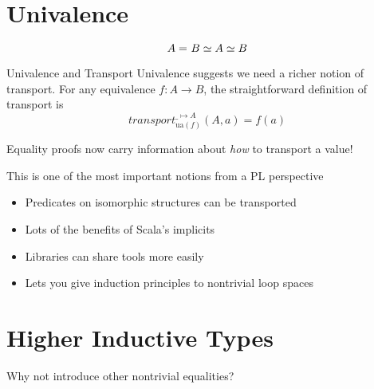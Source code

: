\documentclass[xcolor=svgnames]{beamer}
\begin{document}
\section{Univalence}

\begin{frame}
  \begin{center}
  \end{center}
\end{frame}

\begin{frame}
   $$ A =_{} B \simeq A \simeq B $$


\end{frame}

\begin{frame}{Univalence and Transport}
  Univalence suggests we need a richer notion of transport. For any equivalence
  $f : A \to B$, the straightforward definition of transport is
  $$ transport^{\_ \mapsto A}_{\mathrm{ua}(f)}(A,a) = f(a) $$

  Equality proofs now carry information about \emph{how} to transport a value! \pause

  This is one of the most important notions from a PL perspective
  \begin{itemize}
  \item Predicates on isomorphic structures can be transported
  \item Lots of the benefits of Scala's implicits
  \item Libraries can share tools more easily
  \item Lets you give induction principles to nontrivial loop spaces
  \end{itemize}
\end{frame}

\section{Higher Inductive Types}

\begin{frame}
  \begin{center}
    \Huge Why not introduce other nontrivial equalities?
  \end{center}
\end{frame}
\end{document}
